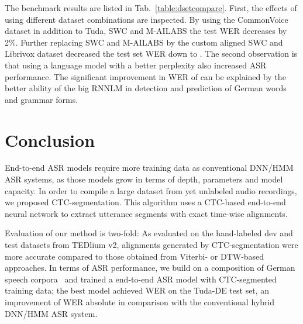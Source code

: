 \documentclass[runningheads]{llncs}
\begin{document}
The benchmark results are listed in Tab.~\ref{table:dsetcompare}.
First, the effects of using different dataset combinations are inspected.
By using the CommonVoice dataset in addition to Tuda, SWC and M-AILABS the test WER decreases by 2\%.
Further replacing SWC and M-AILABS by the custom aligned SWC and Librivox dataset decreased the test set WER down to .
The second observation is that using a language model with a better perplexity also increased ASR performance.
The significant improvement in WER of  can be explained by the better ability of the big RNNLM in detection and prediction of German words and grammar forms.




\section{Conclusion}

End-to-end ASR models require more training data as conventional DNN/HMM ASR systems, as those models grow in terms of depth, parameters and model capacity.
In order to compile a large dataset from yet unlabeled audio recordings, we proposed CTC-segmentation.
This algorithm uses a CTC-based end-to-end neural network to extract utterance segments with exact time-wise alignments.

Evaluation of our method is two-fold:
As evaluated on the hand-labeled dev and test datasets from TEDlium v2, alignments generated by CTC-segmentation were more accurate compared to those obtained from Viterbi- or DTW-based approaches.
In terms of ASR performance, we build on a composition of German speech corpora~\cite{Milde2018} and trained a end-to-end ASR model with CTC-segmented training data;
the best model achieved  WER on the Tuda-DE test set, an improvement of  WER absolute in comparison with the conventional hybrid DNN/HMM ASR system.

















\end{document}
